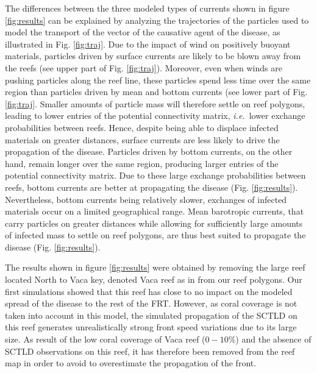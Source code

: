 \documentclass[utf8]{frontiersSCNS}
\newcommand{\ie}{{\it i.e.}\ }
\begin{document}
The differences between the three modeled types of currents shown in figure \ref{fig:results} can be explained by analyzing the trajectories of the particles used to model the transport of the vector of the causative agent of the disease, as illustrated in Fig. \ref{fig:traj}. Due to the impact of wind on positively buoyant materials, particles driven by surface currents are likely to be blown away from the reefs (see upper part of Fig. \ref{fig:traj}). Moreover, even when winds are pushing particles along the reef line, these particles spend less time over the same region than particles driven by mean and bottom currents (see lower part of Fig. \ref{fig:traj}. Smaller amounts of particle mass will therefore settle on reef polygons, leading to lower entries of the potential connectivity matrix, \ie lower exchange probabilities between reefs. Hence, despite being able to displace infected materials on greater distances, surface currents are less likely to drive the propagation of the disease. Particles driven by bottom currents, on the other hand, remain longer over the same region, producing larger entries of the potential connectivity matrix. Due to these large exchange probabilities between reefs, bottom currents are better at propagating the disease (Fig. \ref{fig:results}). Nevertheless, bottom currents being relatively slower, exchanges of infected materials occur on a limited geographical range. Mean barotropic currents, that carry particles on greater distances while allowing for sufficiently large amounts of infected mass to settle on reef polygons, are thus best suited to propagate the disease (Fig. \ref{fig:results}).

The results shown in figure \ref{fig:results} were obtained by removing the large reef located North to Vaca key, denoted Vaca reef as in \citep{frys20} from our reef polygons. Our first simulations showed that this reef has close to no impact on the modeled spread of the disease to the rest of the FRT. However, as coral coverage is not taken into account in this model, the simulated propagation of the SCTLD on this reef generates unrealistically strong front speed variations due to its large size. As result of the low coral coverage of Vaca reef ($0-10\%$) and the absence of SCTLD observations on this reef, it has therefore been removed from the reef map in order to avoid to overestimate the propagation of the front.
\end{document}
